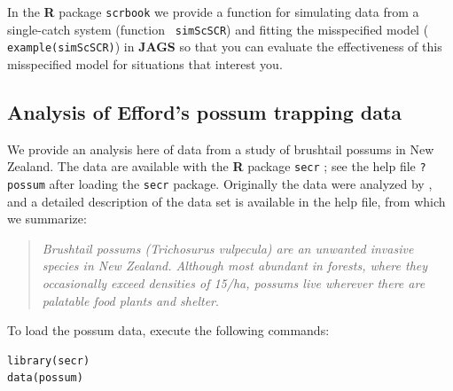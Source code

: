 In the {\bf R} package \mbox{\tt scrbook} we provide a function for
simulating data from a single-catch system (function \mbox{\tt
  simScSCR}) and fitting the misspecified model (\mbox{\tt
  example(simScSCR)}) in {\bf JAGS} so that you can
evaluate the effectiveness of this misspecified model for
situations that interest you.


\subsection{Analysis of Efford's possum trapping data}

We provide an analysis here of data from a study of brushtail possums
in New Zealand. The data are available with the {\bf R} package
\mbox{\tt secr} \citep{efford_etal:2009euring}; see the help file
\mbox{\tt ?possum} after loading the \mbox{\tt secr} package.
Originally the data were analyzed by \citet{efford_etal:2005}, and a
detailed description of the data set is available in the help file,
from which we summarize:
\begin{quote}
{\it Brushtail possums (Trichosurus vulpecula) are an unwanted invasive
species in New Zealand. Although most abundant in forests, where they
occasionally exceed densities of 15/ha, possums live wherever there
are palatable food plants and shelter}.
\end{quote}
To load the possum data, execute the following commands:
\begin{verbatim}
library(secr)
data(possum)
\end{verbatim}

